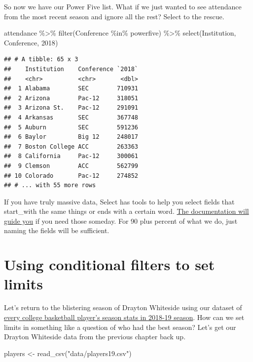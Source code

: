 \documentclass[
]{book}
\newenvironment{Shaded}{\begin{snugshade}}{\end{snugshade}}
\newcommand{\AttributeTok}[1]{\textcolor[rgb]{0.77,0.63,0.00}{#1}}
\newcommand{\FunctionTok}[1]{\textcolor[rgb]{0.00,0.00,0.00}{#1}}
\newcommand{\NormalTok}[1]{#1}
\newcommand{\OtherTok}[1]{\textcolor[rgb]{0.56,0.35,0.01}{#1}}
\newcommand{\SpecialCharTok}[1]{\textcolor[rgb]{0.00,0.00,0.00}{#1}}
\newcommand{\StringTok}[1]{\textcolor[rgb]{0.31,0.60,0.02}{#1}}
\begin{document}
So now we have our Power Five list. What if we just wanted to see attendance from the most recent season and ignore all the rest? Select to the rescue.

\begin{Shaded}
\begin{Highlighting}[]
\NormalTok{attendance }\SpecialCharTok{\%\textgreater{}\%} \FunctionTok{filter}\NormalTok{(Conference }\SpecialCharTok{\%in\%}\NormalTok{ powerfive) }\SpecialCharTok{\%\textgreater{}\%} \FunctionTok{select}\NormalTok{(Institution, Conference, }\StringTok{\textasciigrave{}}\AttributeTok{2018}\StringTok{\textasciigrave{}}\NormalTok{)}
\end{Highlighting}
\end{Shaded}

\begin{verbatim}
## # A tibble: 65 x 3
##    Institution    Conference `2018`
##    <chr>          <chr>       <dbl>
##  1 Alabama        SEC        710931
##  2 Arizona        Pac-12     318051
##  3 Arizona St.    Pac-12     291091
##  4 Arkansas       SEC        367748
##  5 Auburn         SEC        591236
##  6 Baylor         Big 12     248017
##  7 Boston College ACC        263363
##  8 California     Pac-12     300061
##  9 Clemson        ACC        562799
## 10 Colorado       Pac-12     274852
## # ... with 55 more rows
\end{verbatim}

If you have truly massive data, Select has tools to help you select fields that start\_with the same things or ends with a certain word. \href{https://dplyr.tidyverse.org/reference/select.html}{The documentation will guide you} if you need those someday. For 90 plus percent of what we do, just naming the fields will be sufficient.

\hypertarget{using-conditional-filters-to-set-limits}{%
\section{Using conditional filters to set limits}\label{using-conditional-filters-to-set-limits}}

Let's return to the blistering season of Drayton Whiteside using our dataset of \href{https://unl.box.com/s/u99ualyzrrzucunr9edd3m4gvgvorez6}{every college basketball player's season stats in 2018-19 season}. How can we set limits in something like a question of who had the best season? Let's get our Drayton Whiteside data from the previous chapter back up.

\begin{Shaded}
\begin{Highlighting}[]
\NormalTok{players }\OtherTok{\textless{}{-}} \FunctionTok{read\_csv}\NormalTok{(}\StringTok{"data/players19.csv"}\NormalTok{)}
\end{Highlighting}
\end{Shaded}
\end{document}
